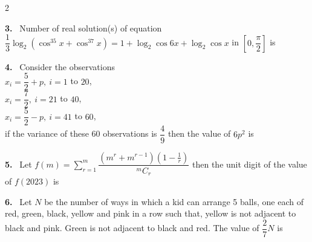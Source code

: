 \documentclass[10pt]{extarticle}
\newcommand{\qn}[1]{\par\smallskip\noindent\textbf{#1.}~}
\begin{document}
\begin{multicols}{2}
\qn{3} Number of real solution(s) of equation $\dfrac13\log_2(\cos^35x+\cos^37x)=1+\log_2\cos6x+\log_2\cos x$ in $\left[0,\dfrac\pi2\right]$ is

\qn{4} Consider the observations\\
\hspace*{1em}$x_i=\dfrac52+p,\ i=1$ to $20$,\\
\hspace*{1em}$x_i=\dfrac72,\ i=21$ to $40$,\\
\hspace*{1em}$x_i=\dfrac52-p,\ i=41$ to $60$,\\
if the variance of these 60 observations is $\dfrac49$ then the value of $6p^2$ is

\qn{5} Let $f(m)=\displaystyle\sum_{r=1}^{m}\dfrac{\left(m^r+m^{r-1}\right)\left(1-\frac1r\right)}{{}^mC_r}$ then the unit digit of the value of $f(2023)$ is

\qn{6} Let $N$ be the number of ways in which a kid can arrange 5 balls, one each of red, green, black, yellow and pink in a row such that, yellow is not adjacent to black and pink. Green is not adjacent to black and red. The value of $\dfrac27N$ is
\end{multicols}
\end{document}
